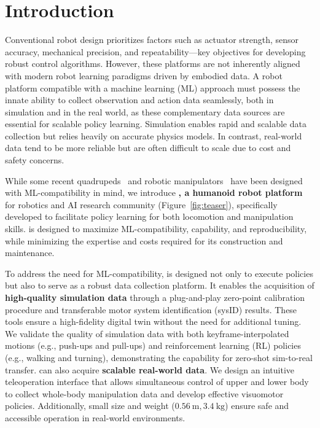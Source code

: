 \section{Introduction}
\label{sec:intro}



Conventional robot design prioritizes factors such as actuator strength, sensor accuracy, mechanical precision, and repeatability---key objectives for developing robust control algorithms. However, these platforms are not inherently aligned with modern robot learning paradigms driven by embodied data. A robot platform compatible with a machine learning (ML) approach must possess the innate ability to collect observation and action data seamlessly, both in simulation and in the real world, as these complementary data sources are essential for scalable policy learning. Simulation enables rapid and scalable data collection but relies heavily on accurate physics models. In contrast, real-world data tend to be more reliable but are often difficult to scale due to cost and safety concerns.

While some recent quadrupeds~\cite{katz2019mini, kau2022stanford} and robotic manipulators~\cite{zhao2023learning, wu2023gello,shaw2023leap, romero2024eyesight, bhirangi2023all} have been designed with ML-compatibility in mind, we introduce \textbf{\system, a humanoid robot platform} for robotics and AI research community (Figure~\ref{fig:teaser}), specifically developed to facilitate policy learning for both locomotion and manipulation skills. \system is designed to maximize ML-compatibility, capability, and reproducibility, while minimizing the expertise and costs required for its construction and maintenance.

To address the need for ML-compatibility, \system is designed not only to execute policies but also to serve as a robust data collection platform. It enables the acquisition of \textbf{high-quality simulation data} through a plug-and-play zero-point calibration procedure and transferable motor system identification (sysID) results. These tools ensure a high-fidelity digital twin without the need for additional tuning. We validate the quality of simulation data with both keyframe-interpolated motions (e.g., push-ups and pull-ups) and reinforcement learning (RL) policies (e.g., walking and turning), demonstrating the capability for zero-shot sim-to-real transfer. \system can also acquire \textbf{scalable real-world data}. We design an intuitive teleoperation interface that allows simultaneous control of \systems upper and lower body to collect whole-body manipulation data and develop effective visuomotor policies. Additionally, \systems small size and weight ($0.56~\mathrm{m}, 3.4~\mathrm{kg}$) ensure safe and accessible operation in real-world environments.

